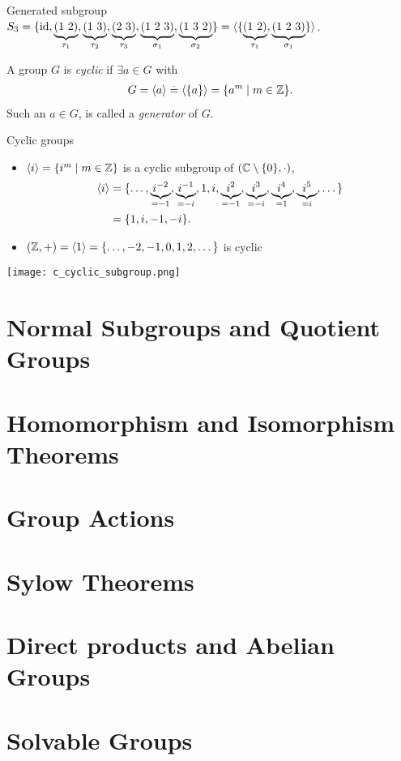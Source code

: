 \begin{ex}{Generated subgroup}{}
$S_3 = \{\id, \underbrace{(1\ 2)}_{\tau_1}, \underbrace{(1\ 3)}_{\tau_2}, \underbrace{(2\ 3)}_{\tau_3}, \underbrace{(1\ 2\ 3)}_{\sigma_1}, \underbrace{(1\ 3\ 2)}_{\sigma_2}\} = \gen{\{\underbrace{(1\ 2)}_{\tau_1}, \underbrace{(1\ 2\ 3)}_{\sigma_1}\}}$.
\end{ex}

\begin{defn}
A group $G$ is \emph{cyclic} if $\exists a \in G$ with \begin{align}
    G = \langle a \rangle \overset{.}{=} \langle \{a\} \rangle = \{a^m \mid m \in \mathbb{Z}\}.
\end{align} Such an $a \in G$, is called a \emph{generator} of $G$.
\end{defn}

\begin{ex}{Cyclic groups}{}
\begin{itemize}
    \item $\langle i \rangle = \{i^m \mid m \in \mathbb{Z}\}$ is a cyclic subgroup of $(\mathbb{C} \setminus \{0\},\cdot)$, \begin{align*}
        \langle i \rangle &= \{\dots, \underbrace{i^{-2}}_{=-1}, \underbrace{i^{-1}}_{=-i}, 1, i, \underbrace{i^2}_{=-1}, \underbrace{i^3}_{=-i}, \underbrace{i^4}_{=1}, \underbrace{i^5}_{=i}, \dots\} \\
                &= \{1, i, -1, -i\}.
    \end{align*}
    \item $(\mathbb{Z},+) = \langle 1 \rangle = \{\dots, -2, -1, 0, 1, 2, \dots\}$ is cyclic
\end{itemize}
\end{ex}

\begin{marginfigure}
    \texttt{[image: c\_cyclic\_subgroup.png]}
    \caption{An illustration of the cyclic subgroup $\gen{i}$ in the complex plane.}
\end{marginfigure}

\begin{defn}[Order]

\end{defn}

\section{Normal Subgroups and Quotient Groups}
\section{Homomorphism and Isomorphism Theorems}
\section{Group Actions}
\section{Sylow Theorems}
\section{Direct products and Abelian Groups}
\section{Solvable Groups}
